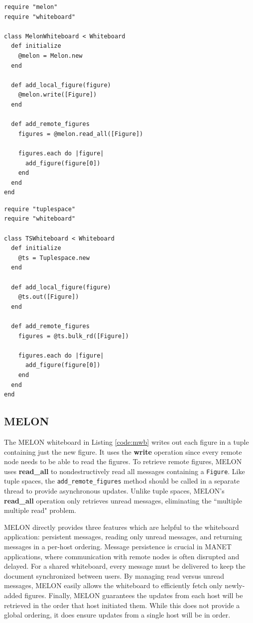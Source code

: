 \begin{lstlisting}[caption={MELON Whiteboard}, label={code:mwb}]
require "melon"
require "whiteboard"

class MelonWhiteboard < Whiteboard
  def initialize
    @melon = Melon.new
  end
  
  def add_local_figure(figure)
    @melon.write([Figure])
  end

  def add_remote_figures
    figures = @melon.read_all([Figure])

    figures.each do |figure|
      add_figure(figure[0])
    end
  end
end
\end{lstlisting}

\begin{lstlisting}[caption={Tuple Space Whiteboard}, label={code:tswb}]
require "tuplespace"
require "whiteboard"

class TSWhiteboard < Whiteboard
  def initialize
    @ts = Tuplespace.new
  end

  def add_local_figure(figure)
    @ts.out([Figure])
  end

  def add_remote_figures
    figures = @ts.bulk_rd([Figure])

    figures.each do |figure|
      add_figure(figure[0])
    end
  end
end 
\end{lstlisting}

\subsection{MELON}

The MELON whiteboard in Listing \ref{code:mwb} writes out each figure in a tuple containing just the new figure. It uses the \textbf{write} operation since every remote node needs to be able to read the figures. To retrieve remote figures, MELON uses \textbf{read\_all} to nondestructively read all messages containing a \texttt{Figure}. Like tuple spaces, the \texttt{add\_remote\_figures} method should be called in a separate thread to provide asynchronous updates. Unlike tuple spaces, MELON's \textbf{read\_all} operation only retrieves unread messages, eliminating the ``multiple multiple read" problem.

MELON directly provides three features which are helpful to the whiteboard application: persistent messages, reading only unread messages, and returning messages in a per-host ordering. Message persistence is crucial in MANET applications, where communication with remote nodes is often disrupted and delayed. For a shared whiteboard, every message must be delivered to keep the document synchronized between users. By managing read versus unread messages, MELON easily allows the whiteboard to efficiently fetch only newly-added figures. Finally, MELON guarantees the updates from each host will be retrieved in the order that host initiated them. While this does not provide a global ordering, it does ensure updates from a single host will be in order.